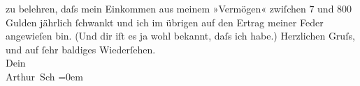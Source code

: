 \begin{ledgroupsized}[t]{13cm}
               zu belehren, daſs mein Einkommen aus meinem »Vermögen« zwiſchen 7 und 800 Gulden
               jährlich ſchwankt und ich im übrigen auf den Ertrag meiner Feder angewieſen bin. (Und
               dir iſt es ja wohl bekannt, daſs ich \label{K_L01237-1v}\label{K_L01237-1h} habe.)\pend
           \pstart
           Herzlichen Gruſs, und auf ſehr baldiges Wiederſehen.{\\[\baselineskip]}Dein{\\[\baselineskip]}\spacefill\mbox{Arthur Sch}\pend
           \leftskip=0em{}
         
         \endnumbering{}\end{ledgroupsized}  \newcommand{\dateiname}{L01237}\newcommand{\titel}{Arthur Schnitzler an Hermann Bahr, 3. 10. 1902}\newcommand{\editorInnen}{ Kurt Ifkovits,  Martin Anton Müller}
      